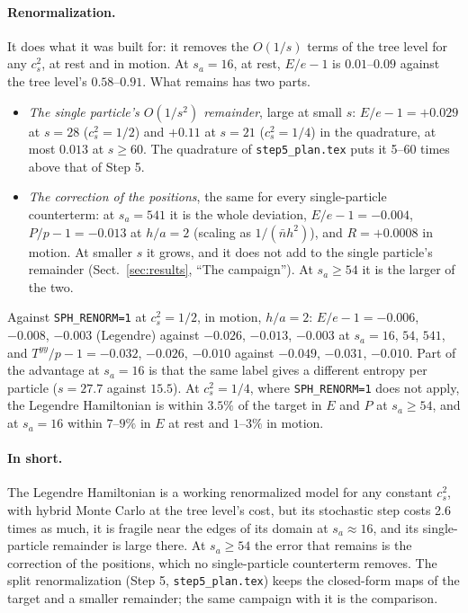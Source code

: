 \documentclass[11pt,aps,preprint,nofootinbib,superscriptaddress,tightenlines]{revtex4-2}
\def\Sect#1{Sect.~\ref{#1}}
\let\oldparagraph\paragraph
\renewcommand{\paragraph}{\par\bigskip\oldparagraph}
\begin{document}
\paragraph{Renormalization.}  It does what it was built for: it removes the $O(1/s)$ terms of the tree level for any $c_s^2$, at rest and in motion.  At
$s_a=16$, at rest, $E/e-1$ is $0.01$--$0.09$ against the tree level's $0.58$--$0.91$.  What remains has two parts.
\begin{itemize}
\item \emph{The single particle's $O(1/s^2)$ remainder}, large at small $s$: $E/e-1=+0.029$ at $s=28$ ($c_s^2=1/2$) and $+0.11$ at $s=21$ ($c_s^2=1/4$) in the
  quadrature, at most $0.013$ at $s\ge60$.  The quadrature of \nolinkurl{step5_plan.tex} puts it 5--60 times above that of Step 5.
\item \emph{The correction of the positions}, the same for every single-particle counterterm: at $s_a=541$ it is the whole deviation, $E/e-1=-0.004$,
  $P/p-1=-0.013$ at $h/a=2$ (scaling as $1/(\bar nh^2)$), and $R=+0.0008$ in motion.  At smaller $s$ it grows, and it does not add to the single particle's
  remainder (\Sect{sec:results}, ``The campaign'').  At $s_a\ge54$ it is the larger of the two.
\end{itemize}
Against \texttt{SPH\_RENORM=1} at $c_s^2=1/2$, in motion, $h/a=2$: $E/e-1=-0.006$, $-0.008$, $-0.003$ (Legendre) against $-0.026$, $-0.013$, $-0.003$ at
$s_a=16$, $54$, $541$, and $T^{yy}/p-1=-0.032$, $-0.026$, $-0.010$ against $-0.049$, $-0.031$, $-0.010$.  Part of the advantage at $s_a=16$ is that the same
label gives a different entropy per particle ($s=27.7$ against $15.5$).  At $c_s^2=1/4$, where \texttt{SPH\_RENORM=1} does not apply, the Legendre
Hamiltonian is within $3.5\%$ of the target in $E$ and $P$ at $s_a\ge54$, and at $s_a=16$ within $7$--$9\%$ in $E$ at rest and $1$--$3\%$ in motion.

\paragraph{In short.}  The Legendre Hamiltonian is a working renormalized model for any constant $c_s^2$, with hybrid Monte Carlo at the tree level's
cost, but its stochastic step costs 2.6 times as much, it is fragile near the edges of its domain at $s_a\approx16$, and its single-particle remainder is
large there.  At $s_a\ge54$ the error that remains is the correction of the positions, which no single-particle counterterm removes.  The split
renormalization (Step 5, \nolinkurl{step5_plan.tex}) keeps the closed-form maps of the target and a smaller remainder; the same campaign with it is the
comparison.
\end{document}
